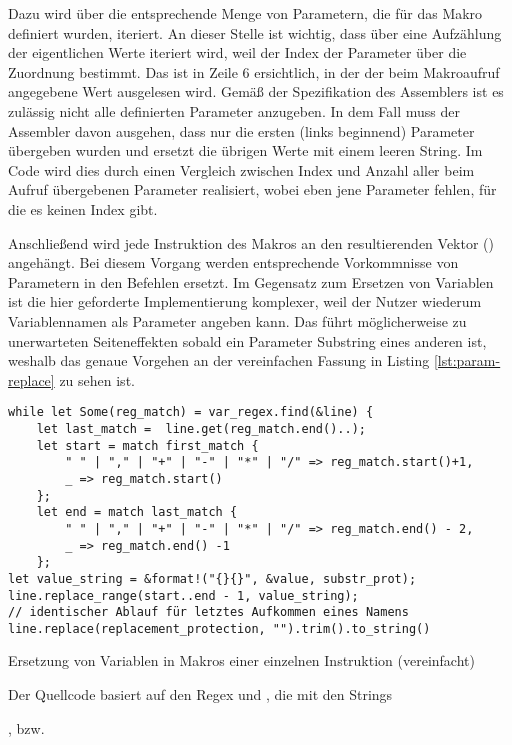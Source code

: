 Dazu wird über die entsprechende Menge von Parametern, die für das Makro definiert wurden, iteriert. An dieser Stelle ist wichtig, dass über eine Aufzählung der eigentlichen Werte iteriert wird, weil der Index der Parameter über die Zuordnung bestimmt. Das ist in Zeile 6 ersichtlich, in der der beim Makroaufruf angegebene Wert ausgelesen wird. Gemäß der Spezifikation des Assemblers ist es zulässig nicht alle definierten Parameter anzugeben. In dem Fall muss der Assembler davon ausgehen, dass nur die ersten (links beginnend) Parameter übergeben wurden und ersetzt die übrigen Werte mit einem leeren String. Im Code wird dies durch einen Vergleich zwischen Index und Anzahl aller beim Aufruf übergebenen Parameter realisiert, wobei eben jene Parameter fehlen, für die es keinen Index gibt.

Anschließend wird jede Instruktion des Makros an den resultierenden Vektor () angehängt. Bei diesem Vorgang werden entsprechende Vorkommnisse von Parametern in den Befehlen ersetzt. Im Gegensatz zum Ersetzen von Variablen ist die hier geforderte Implementierung komplexer, weil der Nutzer wiederum Variablennamen als Parameter angeben kann. Das führt möglicherweise zu unerwarteten Seiteneffekten sobald ein Parameter Substring eines anderen ist, weshalb das genaue Vorgehen an der vereinfachen Fassung in Listing \ref{lst:param-replace} zu sehen ist.

\begin{listing}[th]
\begin{verbatim}
while let Some(reg_match) = var_regex.find(&line) {
    let last_match =  line.get(reg_match.end()..);
    let start = match first_match {
        " " | "," | "+" | "-" | "*" | "/" => reg_match.start()+1,
        _ => reg_match.start()
    };
    let end = match last_match {
        " " | "," | "+" | "-" | "*" | "/" => reg_match.end() - 2,
        _ => reg_match.end() -1
    };
let value_string = &format!("{}{}", &value, substr_prot);
line.replace_range(start..end - 1, value_string);
// identischer Ablauf für letztes Aufkommen eines Namens
line.replace(replacement_protection, "").trim().to_string()
\end{verbatim}
\label{lst:param-replace}
\caption{Ersetzung von Variablen in Makros einer einzelnen Instruktion (vereinfacht)}
\end{listing}

Der Quellcode basiert auf den Regex  und , die mit den Strings 

, bzw. 

